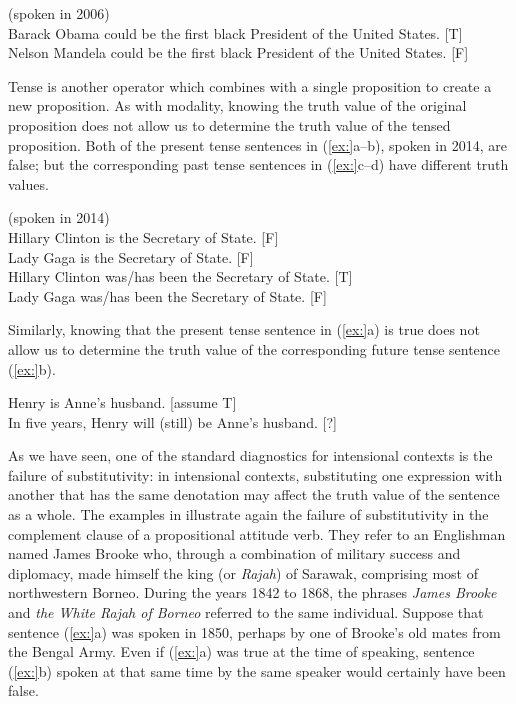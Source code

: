 \ea
(spoken in 2006)\\
\ea Barack Obama could be the first black President of the United States.  [T]\\
\ex Nelson Mandela could be the first black President of the United States.  [F]
                       \z
\z


Tense is another operator which combines with a single proposition to create a new proposition. As with modality, knowing the truth value of the original proposition does not allow us to determine the truth value of the tensed proposition. Both of the present tense sentences in (\ref{ex:}a--b), spoken in 2014, are false; but the corresponding past tense sentences in (\ref{ex:}c--d) have different truth values.


\ea
(spoken in 2014)\\
\ea Hillary Clinton is the Secretary of State.  [F]\\
\ex Lady Gaga is the Secretary of State.  [F]\\
\ex Hillary Clinton was/has been the Secretary of State.  [T]\\
\ex Lady Gaga was/has been the Secretary of State.  [F]
                       \z
\z


Similarly, knowing that the present tense sentence in (\ref{ex:}a) is true does not allow us to determine the truth value of the corresponding future tense sentence (\ref{ex:}b).


\ea
\ea Henry is Anne’s husband.  [assume T]\\
\ex In five years, Henry will (still) be Anne’s husband.  [?]
                       \z
\z


As we have seen, one of the standard diagnostics for intensional contexts is the failure of substitutivity: in intensional contexts, substituting one expression with another that has the same denotation may affect the truth value of the sentence as a whole. The examples in  illustrate again the failure of substitutivity in the complement clause of a propositional attitude verb. They refer to an Englishman named James Brooke who, through a combination of military success and diplomacy, made himself the king (or \textit{Rajah}) of Sarawak, comprising most of northwestern Borneo. During the years 1842 to 1868, the phrases \textit{James Brooke} and \textit{the White Rajah of Borneo} referred to the same individual. Suppose that sentence (\ref{ex:}a) was spoken in 1850, perhaps by one of Brooke’s old mates from the Bengal Army. Even if (\ref{ex:}a) was true at the time of speaking, sentence (\ref{ex:}b) spoken at that same time by the same speaker would certainly have been false.


